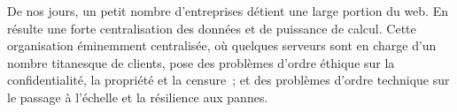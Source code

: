 




De nos jours, un petit nombre d'entreprises détient une large portion du web. En
résulte une forte centralisation des données et de puissance de calcul. Cette
organisation éminemment centralisée, où quelques serveurs sont en charge d'un
nombre titanesque de clients, pose des problèmes d'ordre éthique sur la
confidentialité, la propriété et la censure~\cite{cherrueau2016composer,
  gellman2013us, pearson2011toward}; et des problèmes d'ordre technique sur le
passage à l'échelle et la résilience aux pannes.

 




